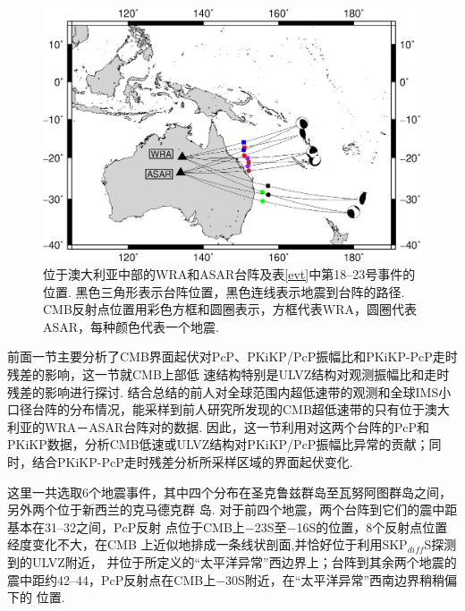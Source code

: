 \begin{figure}[ht]
\centering
\includegraphics[width=0.8\linewidth]{fig/chap3/evt_au}
\caption{位于澳大利亚中部的WRA和ASAR台阵及表\ref{evt}中第18--23号事件的位置. 黑色三角形表示台阵位置，黑色连线表示地震到台阵的路径. CMB反射点位置用彩色方框和圆圈表示，方框代表WRA，圆圈代表ASAR，每种颜色代表一个地震. }
\label{fig:evt_au}
\end{figure}

前面一节主要分析了CMB界面起伏对PcP、PKiKP/PcP振幅比和PKiKP-PcP走时残差的影响，这一节就CMB上部低
速结构特别是ULVZ结构对观测振幅比和走时残差的影响进行探讨. 结合\citet{McNamara2010}总结的前人对全球范围内超低速带的观测和全球IMS小口径台阵的分布情况，能采样到前人研究所发现的CMB超低速带的只有位于澳大利亚的WRA－ASAR台阵对的数据. 因此，这一节利用对这两个台阵的PcP和PKiKP数据，分析CMB低速或ULVZ结构对PKiKP/PcP振幅比异常的贡献；同时，结合PKiKP-PcP走时残差分析所采样区域的界面起伏变化. 

这里一共选取6个地震事件，其中四个分布在圣克鲁兹群岛至瓦努阿图群岛之间，另外两个位于新西兰的克马德克群
岛. 对于前四个地震，两个台阵到它们的震中距基本在31{\textdegree}--32{\textdegree}之间，PcP反射
点位于CMB上$-$23{\textdegree}S至$-$16{\textdegree}S的位置，8个反射点位置经度变化不大，在CMB
上近似地排成一条线状剖面,并恰好位于\citet{Thorne2004a}利用SKP${}_{diff}$S探测到的ULVZ附近，
并位于\citet{He2012a}所定义的“太平洋异常”西边界上；台阵到其余两个地震的震中距约42{\textdegree}--44{\textdegree}，PcP反射点在CMB上$-$30{\textdegree}S附近，在“太平洋异常”西南边界稍稍偏下的
位置. 

